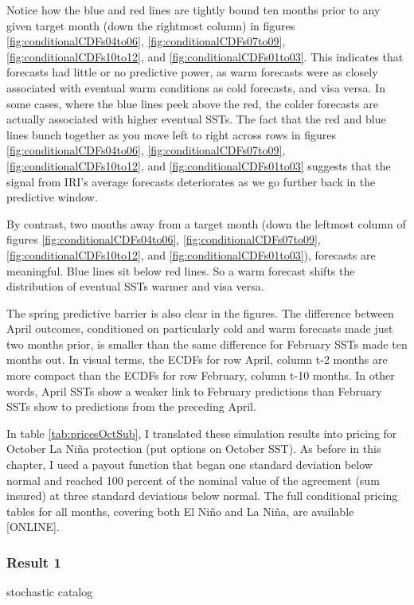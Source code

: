 \documentclass[authoryear]{article}
\begin{document}
Notice how the blue and red lines are tightly bound ten months prior to any given target month (down the rightmost column) in figures \ref{fig:conditionalCDFs04to06}, \ref{fig:conditionalCDFs07to09}, \ref{fig:conditionalCDFs10to12}, and \ref{fig:conditionalCDFs01to03}. This indicates that forecasts had little or no predictive power, as warm forecasts were as closely associated with eventual warm conditions as cold forecasts, and visa versa. In some cases, where the blue lines peek above the red, the colder forecasts are actually associated with higher eventual SSTs. The fact that the red and blue lines bunch together as you move left to right across rows in figures \ref{fig:conditionalCDFs04to06}, \ref{fig:conditionalCDFs07to09}, \ref{fig:conditionalCDFs10to12}, and \ref{fig:conditionalCDFs01to03} suggests that the signal from IRI's average forecasts deteriorates as we go further back in the predictive window.

By contrast, two months away from a target month (down the leftmost column of figures \ref{fig:conditionalCDFs04to06}, \ref{fig:conditionalCDFs07to09}, \ref{fig:conditionalCDFs10to12}, and \ref{fig:conditionalCDFs01to03}), forecasts are meaningful. Blue lines sit below red lines. So a warm forecast shifts the distribution of eventual SSTs warmer and visa versa.

The spring predictive barrier is also clear in the figures. The difference between April outcomes, conditioned on particularly cold and warm forecasts made just two months prior, is smaller than the same difference for February SSTs made ten months out. In visual terms, the ECDFs for row April, column t-2 months are more compact than the ECDFs for row February, column t-10 months. In other words, April SSTs show a weaker link to February predictions than February SSTs show to predictions from the preceding April. 



In table \ref{tab:pricesOctSub}, I translated these simulation results into pricing for October La Ni\~na protection (put options on October SST). As before in this chapter, I used a payout function that began one standard deviation below normal and reached 100 percent of the nominal value of the agreement (sum insured) at three standard deviations below normal. The full conditional pricing tables for all months, covering both El Ni\~no and La Ni\~na, are available [ONLINE].


\subsubsection{Result 1} 
stochastic catalog
\end{document}
